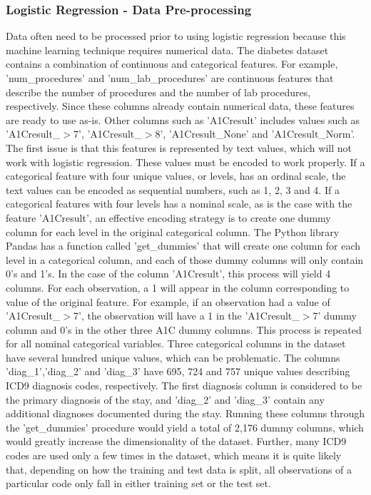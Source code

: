 \documentclass[sigconf]{acmart}
\begin{document}
\subsubsection{Logistic Regression - Data Pre-processing}

Data often need to be processed prior to using logistic regression because this machine learning technique requires numerical data. The diabetes dataset contains a combination of continuous and categorical features. For example, 'num\_procedures' and 'num\_lab\_procedures' are continuous features that describe the number of procedures and the number of lab procedures, respectively. Since these columns already contain numerical data, these features are ready to use as-is. Other columns such as 'A1Cresult' includes values such as 'A1Cresult\_$>$7', 'A1Cresult\_$>$8', 'A1Cresult\_None' and 'A1Cresult\_Norm'. The first issue is that this features is represented by text values, which will not work with logistic regression. These values must be encoded to work properly. If a categorical feature with four unique values, or levels, has an ordinal scale, the text values can be encoded as sequential numbers, such as 1, 2, 3 and 4. If a categorical features with four levels has a nominal scale, as is the case with the feature 'A1Cresult', an effective encoding strategy is to create one dummy column for each level in the original categorical column.
The Python library Pandas has a function called 'get\_dummies' that will create one column for each level in a categorical column, and each of those dummy columns will only contain 0's and 1's. In the case of the column 'A1Cresult', this process will yield 4 columns. For each observation, a 1 will appear in the column corresponding to value of the original feature. For example, if an observation had a value of 'A1Cresult\_$>$7', the observation will have a 1 in the 'A1Cresult\_$>$7' dummy column and 0's in the other three A1C dummy columns. This process is repeated for all nominal categorical variables.
Three categorical columns in the dataset have several hundred unique values, which can be problematic. The columns 'diag\_1','diag\_2' and 'diag\_3' have 695, 724 and 757 unique values describing ICD9 diagnosis codes, respectively. The first diagnosis column is considered to be the primary diagnosis of the stay, and 'diag\_2' and 'diag\_3' contain any additional diagnoses documented during the stay. Running these columns through the 'get\_dummies' procedure would yield a total of 2,176 dummy columns, which would greatly increase the dimensionality of the dataset. Further, many ICD9 codes are used only a few times in the dataset, which means it is quite likely that, depending on how the training and test data is split, all observations of a particular code only fall in either training set or the test set.
\end{document}
